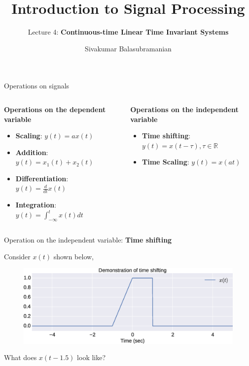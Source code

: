 \documentclass{beamer}
\title{Introduction to Signal Processing}
\subtitle{Lecture 4: \textbf{Continuous-time Linear Time Invariant Systems}}
\author{Sivakumar Balasubramanian}
\institute[Christian Medical College] %
{
  \inst{}%
  Department of Bioengineering\\
  Christian Medical College, Bagayam\\
  Vellore 632002
}
\date{}
\begin{document}
\begin{frame}
  \titlepage
\end{frame}

\begin{frame}{Operations on signals}

\begin{columns}
	\begin{column}{.6\linewidth}
	\textbf{Operations on the dependent variable}
	\begin{itemize}
		\item \textbf{Scaling}: $y(t) = ax(t)$
		\item \textbf{Addition}: $y(t) = x_1(t) + x_2(t)$
		\item \textbf{Differentiation}: $y(t) = \frac{d}{dt}x(t)$
		\item \textbf{Integration}: $y(t) = \int_{-\infty}^{t}x(t)dt$
	\end{itemize}
	\end{column}

	\begin{column}{.5\linewidth}
	\textbf{Operations on the independent variable}
	\begin{itemize}
		\item \textbf{Time shifting}: $y(t) = x(t - \tau), \tau \in \mathbb{R}$
		\item \textbf{Time Scaling}: $y(t) = x(at)$
	\end{itemize}
	\end{column}
\end{columns}

\end{frame}

\begin{frame}{Operation on the independent variable: \textbf{Time shifting}}

Consider $x(t)$ shown below,

\begin{figure}
\includegraphics[width=\textwidth]{img/tshift0.eps}
\end{figure}

What does $x(t-1.5)$ look like?

\end{frame}
\end{document}
